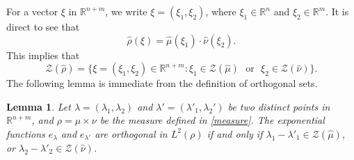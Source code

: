 \documentclass[reqno,a4paper,12pt]{amsart}
\numberwithin{equation}{section}
\newcounter{rem}
\newtheorem{lemma}[theorem]{Lemma}
\theoremstyle{remark}
\numberwithin{equation}{section}
\begin{document}
%


For a vector $\xi$ in $\mathbb{R}^{n+m}$, we write $\xi=(\xi_{1},\xi_{2})$, where $\xi_{1}\in\mathbb{R}^n$ and $\xi_{2}\in\mathbb{R}^m$. It is direct to see that
\[
\widehat{\rho}(\xi)=\widehat{\mu}(\xi_{1})\cdot \widehat{\nu}(\xi_{2}).
\]
This implies  that
\[
\mathcal{Z}(\widehat{\rho})=\{\xi=(\xi_{1},\xi_{2})\in\mathbb{R}^{n+m}:\text{$\xi_{1}\in\mathcal{Z}(\widehat{\mu})$ ~or ~$\xi_{2}\in\mathcal{Z}(\widehat{\nu})$}\}.
\]
The following lemma is immediate from the definition of orthogonal sets. 


\begin{lemma}\label{zero}
Let $\lambda =(\lambda_1,\lambda_2)$ and $\lambda'=(\lambda'_1,\lambda_2')$ be two distinct points in $\mathbb{R}^{n+m}$, and $\rho=\mu\times\nu$ be the measure defined in \eqref{measure}. The exponential functions $e_{\lambda}$ and $e_{\lambda'}$ are orthogonal in $L^{2}(\rho)$ if and only if $\lambda_{1}-\lambda'_{1}\in \mathcal{Z}(\widehat{\mu})$, or $\lambda_{2}-\lambda'_{2}\in \mathcal{Z}(\widehat{\nu})$. %
\end{lemma}

\end{document}
